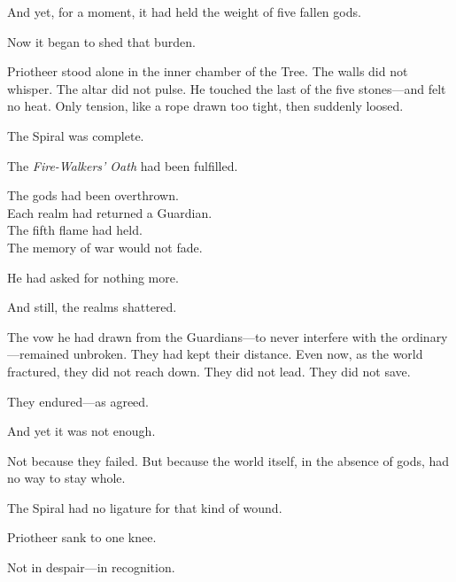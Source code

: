 \documentclass[9pt]{article}
\begin{document}
\vspace{0.5em}
And yet, for a moment, it had held the weight of five fallen gods.

\vspace{0.5em}
Now it began to shed that burden.

\vspace{0.5em}
Priotheer stood alone in the inner chamber of the Tree. The walls did not whisper. The altar did not pulse. He touched the last of the five stones---and felt no heat. Only tension, like a rope drawn too tight, then suddenly loosed.

\vspace{0.5em}
The Spiral was complete.

\vspace{0.5em}
The \textit{Fire-Walkers’ Oath} had been fulfilled.

\vspace{0.5em}
The gods had been overthrown.\\
Each realm had returned a Guardian.\\
The fifth flame had held.\\
The memory of war would not fade.

\vspace{0.5em}
He had asked for nothing more.

\vspace{0.5em}
And still, the realms shattered.

\vspace{0.5em}
The vow he had drawn from the Guardians---to never interfere with the ordinary---remained unbroken. They had kept their distance. Even now, as the world fractured, they did not reach down. They did not lead. They did not save.

\vspace{0.5em}
They endured---as agreed.

\vspace{0.5em}
And yet it was not enough.

\vspace{0.5em}
Not because they failed. But because the world itself, in the absence of gods, had no way to stay whole.

\vspace{0.5em}
The Spiral had no ligature for that kind of wound.

\vspace{0.5em}
Priotheer sank to one knee.

\vspace{0.5em}
Not in despair---in recognition.
\end{document}
